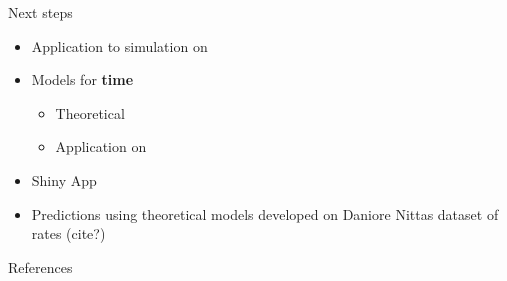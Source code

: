\documentclass[english]{beamer}\usepackage[]{graphicx}\usepackage[]{xcolor}
\begin{document}
\begin{frame}{Next steps}
\begin{itemize}
\item Application to simulation on \cite{carter2004application}
\item Models for \textbf{time} 
	\begin{itemize}
	\item Theoretical
	\item Application on \cite{carter2004application}
	\end{itemize}
\item Shiny App
\item Predictions using theoretical models developed on Daniore Nittas dataset of rates (cite?)
\end{itemize}

\end{frame}

\begin{frame}{References}
  \small
  

\end{frame}


\end{document}
